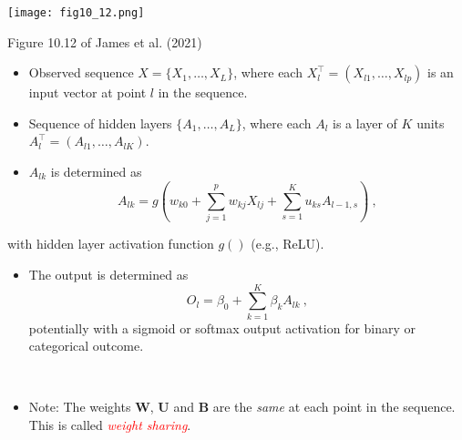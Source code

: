 \documentclass[
  10pt,
  ignorenonframetext,
]{beamer}
\providecommand{\tightlist}{%
  \setlength{\itemsep}{0pt}\setlength{\parskip}{0pt}}
\begin{document}
\begin{frame}
\centering

\texttt{[image: fig10\_12.png]}

\scriptsize Figure 10.12 of James et al. (2021)

\normalsize

\begin{itemize}
\item
  Observed sequence \(X=\{ X_1, \ldots , X_L \}\), where each
  \(X_l^\top=(X_{l1},\ldots, X_{lp})\) is an input vector at point \(l\)
  in the sequence.
\item
  Sequence of hidden layers \(\{ A_1, \ldots, A_L \}\), where each
  \(A_l\) is a layer of \(K\) units
  \(A_l^\top = (A_{l1}, \ldots , A_{lK})\).
\item
  \(A_{lk}\) is determined as \begin{equation}\label{eq:chain}
  A_{lk} = g(w_{k0} + \sum_{j=1}^p w_{kj}X_{lj} + \sum_{s=1}^K u_{ks}A_{l-1,s}) \ ,
  \end{equation}
\end{itemize}

with hidden layer activation function \(g()\) (e.g., ReLU).
\end{frame}

\begin{frame}
\begin{itemize}
\tightlist
\item
  The output is determined as
  \[O_l = \beta_0 + \sum_{k=1}^K\beta_k A_{lk} \ ,\] potentially with a
  sigmoid or softmax output activation for binary or categorical
  outcome.
\end{itemize}

\(~\)

\begin{itemize}
\tightlist
\item
  Note: The weights \(\boldsymbol{W}\), \(\boldsymbol{U}\) and
  \(\boldsymbol{B}\) are the \emph{same} at each point in the sequence.
  This is called \emph{\textcolor{red}{weight sharing}}.
\end{itemize}
\end{frame}
\end{document}
